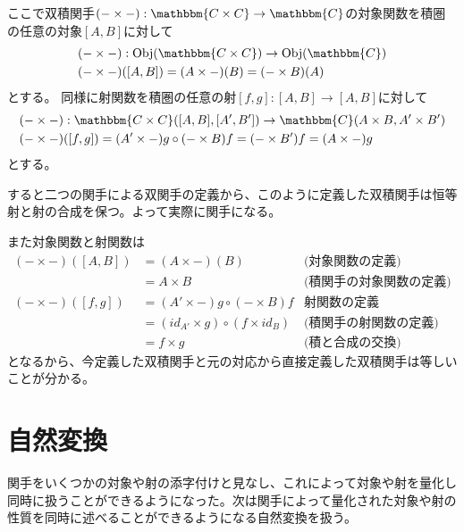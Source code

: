 \documentclass[uplatex,dvipdfmx]{jsarticle}
\newcommand{\cat}[1]{\mathbbm{#1}}
\newcommand{\arrow}{\rightarrow}
\newcommand{\functor}[3]{#1:\cat{#2}\arrow \cat{#3}}
\newcommand{\obj}[1]{\mathrm{Obj}(\cat{#1})}
\newcommand{\mor}[3]{#1:#2\arrow #3}
\newcommand{\arset}[3]{\cat{#1}(#2,#3)}
\newcommand{\pcobj}[1]{[#1]}
\numberwithin{proof}{subsection}
\numberwithin{prop}{subsection}
\numberwithin{define}{subsection}
\begin{document}
	ここで双積関手$\functor{(-\times -)}{C\times C}{C}$の対象関数を積圏の任意の対象$\pcobj{A,B}$に対して
	\begin{align*}
		\mor{&(-\times -)}{\obj{C\times C}}{\obj{C}}\\
		&(-\times -)(\pcobj{A,B})=(A\times -)(B)=(-\times B)(A)
	\end{align*}
	とする。
	同様に射関数を積圏の任意の射$\mor{\pcobj{f,g}}{\pcobj{A,B}}{\pcobj{A,B}}$に対して
	\begin{align*}
		\mor{&(-\times -)}{\arset{C\times C}{\pcobj{A,B}}{\pcobj{A',B'}}}{\arset{C}{A\times B}{A'\times B'}}\\
		&(-\times -)(\pcobj{f,g})=(A'\times -)g\circ (-\times B)f=(-\times B')f=(A\times -)g
	\end{align*}
	とする。

	すると二つの関手による双関手の定義から、このように定義した双積関手は恒等射と射の合成を保つ。よって実際に関手になる。

	また対象関数と射関数は
	\begin{align*}
		(-\times -)(\pcobj{A,B})&=(A\times -)(B)&\text{(対象関数の定義)}\\
		&=A\times B&\text{(積関手の対象関数の定義)}\\
		(-\times -)(\pcobj{f,g})&=(A'\times -)g\circ (-\times B)f&\text{射関数の定義}\\
		&=(id_{A'}\times g)\circ(f\times id_B)&\text{(積関手の射関数の定義)}\\
		&=f\times g&\text{(積と合成の交換)}
	\end{align*}
	となるから、今定義した双積関手と元の対応から直接定義した双積関手は等しいことが分かる。

	\section{自然変換}
  関手をいくつかの対象や射の添字付けと見なし、これによって対象や射を量化し同時に扱うことができるようになった。次は関手によって量化された対象や射の性質を同時に述べることができるようになる自然変換を扱う。
\end{document}
